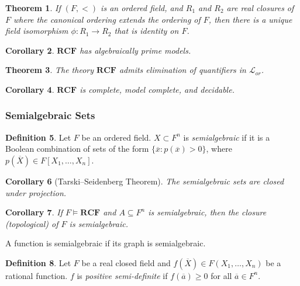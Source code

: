 \documentclass{amsart}
\newtheorem{theorem}{Theorem}[section]
\newtheorem{corollary}[theorem]{Corollary}
\theoremstyle{definition}
\newtheorem{definition}[theorem]{Definition}
\numberwithin{equation}{section}
\begin{document}
\begin{theorem}
    If $(F,<)$ is an ordered field,
    and $R_1$ and $R_2$ are real closures of $F$ where the canonical ordering extends the ordering of $F$,
    then there is a unique field isomorphism $\phi: R_1 \to R_2$ that is identity on $F$.
\end{theorem}

\begin{corollary}
    $\mathbf{RCF}$ has algebraically prime models.
\end{corollary}

\begin{theorem}
    The theory $\mathbf{RCF}$ admits elimination of quantifiers in $\mathcal{L}_{or}$.
\end{theorem}

\begin{corollary}
    $\mathbf{RCF}$ is complete, model complete, and decidable.
\end{corollary}

\subsubsection{Semialgebraic Sets}
\begin{definition}
    Let $F$ be an ordered field.
    $X \subset F^n$ is \emph{semialgebraic} if it is a Boolean combination of sets of the form $\{\overline{x}:p(\overline{x})>0\}$,
    where $p(\overline{X}) \in F[X_1,\dots,X_n]$.
\end{definition}

\begin{corollary}[Tarski--Seidenberg Theorem]
    The semialgebraic sets are closed under projection.
\end{corollary}

\begin{corollary}
    If $F \models \mathbf{RCF}$ and $A \subseteq F^n$ is semialgebraic,
    then the closure (topological) of $F$ is semialgebraic.
\end{corollary}

A function is semialgebraic if its graph is semialgebraic.

\begin{definition}
    Let $F$ be a real closed field and
    $f(\overline{X}) \in F(X_1,\dots,X_n)$ be a rational function.
    $f$ is \emph{positive semi-definite} if $f(\overline{a}) \ge 0$ for all $\overline{a} \in F^n$.
\end{definition}
\end{document}
